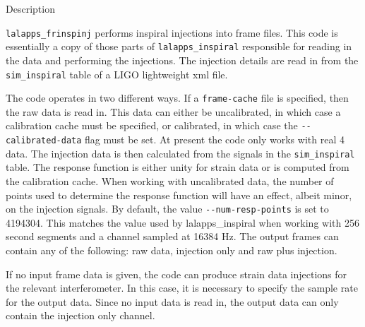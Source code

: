 \begin{entry}
\item[Description] 

\verb$lalapps_frinspinj$ performs inspiral injections into frame files.
This code is essentially a copy of those parts of
\verb$lalapps_inspiral$ responsible for reading in the data and
performing the injections.  The injection details are read in from the 
\verb$sim_inspiral$ table of a LIGO lightweight xml file.  

The code operates in two different ways.  If a \verb$frame-cache$ file
is specified, then the raw data is read in.  This data can either be
uncalibrated, in which case a calibration cache must be specified, or
calibrated, in which case the \verb$--calibrated-data$ flag must be set.
At present the code only works with real 4 data.  The injection data is
then calculated from the signals in the \verb$sim_inspiral$ table.  The
response function is either unity for strain data or is computed from
the calibration cache.  When working with uncalibrated data, the number
of points used to determine the response function will have an effect,
albeit minor, on the injection signals.  By default, the value
\verb$--num-resp-points$ is set to 4194304.  This matches the value
used by lalapps\_inspiral when working with 256 second segments and a
channel sampled at 16384 Hz.  The output frames can contain any of
the following: raw data, injection only and raw plus injection.  

If no input frame data is given, the code can produce strain data
injections for the relevant interferometer.  In this case, it is
necessary to specify the sample rate for the output data.  Since no
input data is read in, the output data can only contain the injection
only channel.


\end{entry}
